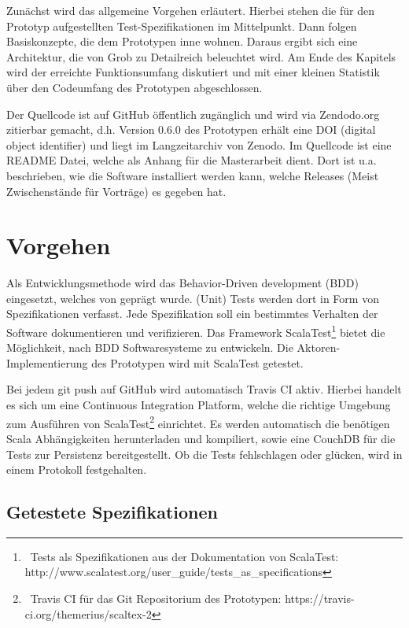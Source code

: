  
Zunächst wird das allgemeine Vorgehen erläutert. Hierbei stehen die für den Prototyp aufgestellten Test-Spezifikationen im Mittelpunkt. Dann folgen Basiskonzepte, die dem Prototypen inne wohnen. Daraus ergibt sich eine Architektur, die von Grob zu Detailreich beleuchtet wird. Am Ende des Kapitels wird der erreichte Funktionsumfang diskutiert und mit einer kleinen Statistik über den Codeumfang des Prototypen abgeschlossen.

 
Der Quellcode \citep{HodappScaltex} ist auf GitHub öffentlich zugänglich und wird via Zendodo.org zitierbar gemacht, d.h. Version 0.6.0 des Prototypen erhält eine DOI (digital object identifier) und liegt im Langzeitarchiv von Zenodo. Im Quellcode ist eine README Datei, welche als Anhang für die Masterarbeit dient. Dort ist u.a. beschrieben, wie die Software installiert werden kann, welche Releases (Meist Zwischenstände für Vorträge) es gegeben hat.

 
\section{Vorgehen}\label{}
 
Als Entwicklungsmethode wird das Behavior-Driven development (BDD) eingesetzt, welches von \citep{North} geprägt wurde. (Unit) Tests werden dort in Form von Spezifikationen verfasst. Jede Spezifikation soll ein bestimmtes Verhalten der Software dokumentieren und verifizieren. Das Framework ScalaTest\footnote{~Tests als Spezifikationen aus der Dokumentation von ScalaTest: http://www.scalatest.org/user\_guide/tests\_as\_specifications} bietet die Möglichkeit, nach BDD Softwaresysteme zu entwickeln. Die Aktoren-Implementierung des Prototypen wird mit ScalaTest getestet.

 
Bei jedem git push auf GitHub wird automatisch Travis CI aktiv. Hierbei handelt es sich um eine Continuous Integration Platform, welche die richtige Umgebung zum Ausführen von ScalaTest\footnote{~Travis CI für das Git Repositorium des Prototypen: https://travis-ci.org/themerius/scaltex-2} einrichtet. Es werden automatisch die benötigen Scala Abhängigkeiten herunterladen und kompiliert, sowie eine CouchDB für die Tests zur Persistenz bereitgestellt. Ob die Tests fehlschlagen oder glücken, wird in einem Protokoll festgehalten.

 
\subsection{Getestete Spezifikationen}\label{}
 
